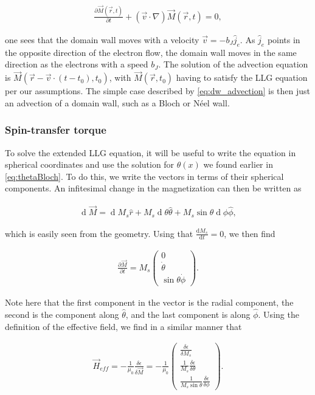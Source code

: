 \documentclass[1p]{elsarticle}		%
\renewcommand{\d}[1]{\ensuremath{\operatorname{d}\!{#1}}}
\numberwithin{equation}{section}
\begin{document}
\begin{align}
\label{eq:advection}
\frac{\partial \vec{M}(\vec{r}, t)}{\partial t} + (\vec{v}\cdot\nabla) \vec{M}(\vec{r}, t) = 0,
\end{align}

one sees that the domain wall moves with a velocity $\vec{v} = -b_J \hat{j}_e$. As $\hat{j}_e$ points in the opposite direction of the electron flow, the domain wall moves in the same direction as the electrons with a speed $b_J$. The solution of the advection equation is $\vec{M}(\vec{r} - \vec{v} \cdot (t - t_0), t_0)$, with $\vec{M}(\vec{r}, t_0)$ having to satisfy the LLG equation per our assumptions. The simple case described by \eqref{eq:dw_advection} is then just an advection of a domain wall, such as a Bloch or N\'{e}el wall.

\subsubsection{Spin-transfer torque}
To solve the extended LLG equation, it will be useful to write the equation in spherical coordinates and use the solution for $\theta(x)$ we found earlier in \eqref{eq:thetaBloch}. To do this, we write the vectors in terms of their spherical components. An infitesimal change in the magnetization can then be written as

\begin{align}
\label{eq:dm_spherical}
\d {\vec{M}} = \d M_s \hat{r} + M_s \d {\theta} \hat{\theta} + M_s\sin\theta\d {\phi} \hat{\phi},
\end{align}

which is easily seen from the geometry. Using that $\frac{\textrm{d} M_s}{\textrm{d} t} = 0$, we then find

\begin{align}
\frac{\partial \vec{M}}{\partial t} = M_s
\begin{pmatrix}
0 \\ 
\dot{\theta} \\ 
\sin\theta\dot{\phi}
\end{pmatrix}.
\end{align}

Note here that the first component in the vector is the radial component, the second is the component along $\hat{\theta}$, and the last component is along $\hat{\phi}$. Using the definition of the effective field, we find in a similar manner that

\begin{align}
\vec{H}_{eff} = -\frac{1}{\mu_0} \frac{\delta \epsilon}{\delta \vec{M}} = -\frac{1}{\mu_0}
\begin{pmatrix}
\frac{\delta \epsilon}{\delta M_s} \\ 
\frac{1}{M_s} \frac{\delta \epsilon}{\delta \theta} \\ 
\frac{1}{M_s\sin\theta} \frac{\delta \epsilon}{\delta \phi}
\end{pmatrix}.
\end{align}
\end{document}
